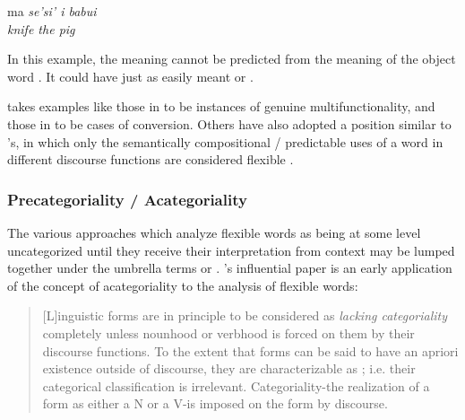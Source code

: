 \begin{exe}
  \ex\label{ex:2.6}
  \vfix
  \gll ma       \em{se'si'} i   babui\\
        \em{knife}  the pig\\
  \vfix
\end{exe}

\noindent In this example, the meaning  cannot be predicted from the meaning of the object word . It could have just as easily meant  or .

\citeauthor{Lier2012} takes examples like those in  to be instances of genuine multifunctionality, and those in  to be cases of conversion. Others have also adopted a position similar to \citeauthor{Lier2012}'s, in which only the semantically compositional / predictable uses of a word in different discourse functions are considered flexible \parencites[§2.2.2--§2.2.3]{Croft2001b}[§3.2]{EvansOsada2005}.

\subsubsection{Precategoriality / Acategoriality}
\label{sec:2.3.1.4}

The various approaches which analyze flexible words as being at some level uncategorized until they receive their interpretation from context may be lumped together under the umbrella terms  or . \citeauthor{HopperThompson1984}'s influential \parencite*{HopperThompson1984} paper is an early application of the concept of acategoriality to the analysis of flexible words:

\blockquote[{\cite[747]{HopperThompson1984}}]{[L]inguistic forms are in principle to be considered as \emph{lacking categoriality} completely unless nounhood or verbhood is forced on them by their discourse functions. To the extent that forms can be said to have an apriori existence outside of discourse, they are characterizable as ; i.e. their categorical classification is irrelevant. Categoriality-the realization of a form as either a N or a V-is imposed on the form by discourse.}

